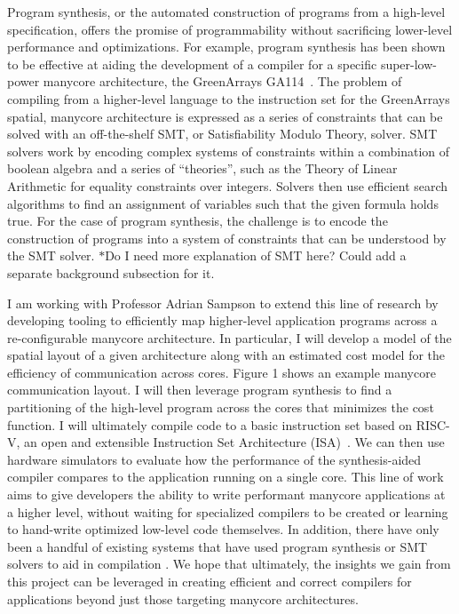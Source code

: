 \documentclass{sig-alternate-05-2015}
\newcommand{\note}{\color{red}$*$}
\begin{document}
Program synthesis, or the automated construction of programs from a high-level specification, offers the promise of programmability without sacrificing lower-level performance and optimizations. For example, program synthesis has been shown to be effective at aiding the development of a compiler for a specific super-low-power manycore architecture, the GreenArrays GA114~\cite{chlorophyll}. The problem of compiling from a higher-level language to the instruction set for the GreenArrays spatial, manycore architecture is expressed as a series of constraints that can be solved with an off-the-shelf SMT, or Satisfiability Modulo Theory, solver. SMT solvers work by encoding complex systems of constraints within a combination of boolean algebra and a series of ``theories'', such as the Theory of Linear Arithmetic for equality constraints over integers. Solvers then use efficient search algorithms to find an assignment of variables such that the given formula holds true. For the case of program synthesis, the challenge is to encode the construction of programs into a system of constraints that can be understood by the SMT solver. {\note Do I need more explanation of SMT here? Could add a separate background subsection for it.}

I am working with Professor Adrian Sampson to extend this line of research by developing tooling to efficiently map higher-level application programs across a re-configurable manycore architecture. In particular, I will develop a model of the spatial layout of a given architecture along with an estimated cost model for the efficiency of communication across cores. Figure 1 shows an example manycore communication layout. I will then leverage program synthesis to find a partitioning of the high-level program across the cores that minimizes the cost function. I will ultimately compile code to a basic instruction set based on RISC-V, an open and extensible Instruction Set Architecture (ISA)~\cite{risc-v}. We can then use hardware simulators to evaluate how the performance of the synthesis-aided compiler compares to the application running on a single core. This line of work aims to give developers the ability to write performant manycore applications at a higher level, without waiting for specialized compilers to be created or learning to hand-write optimized low-level code themselves. In addition, there have only been a handful of existing systems that have used program synthesis or SMT solvers to aid in compilation \cite{chlorophyll, alive, optgen, souper, future}. We hope that ultimately, the insights we gain from this project can be leveraged in creating efficient and correct compilers for applications beyond just those targeting manycore architectures. 
\end{document}
